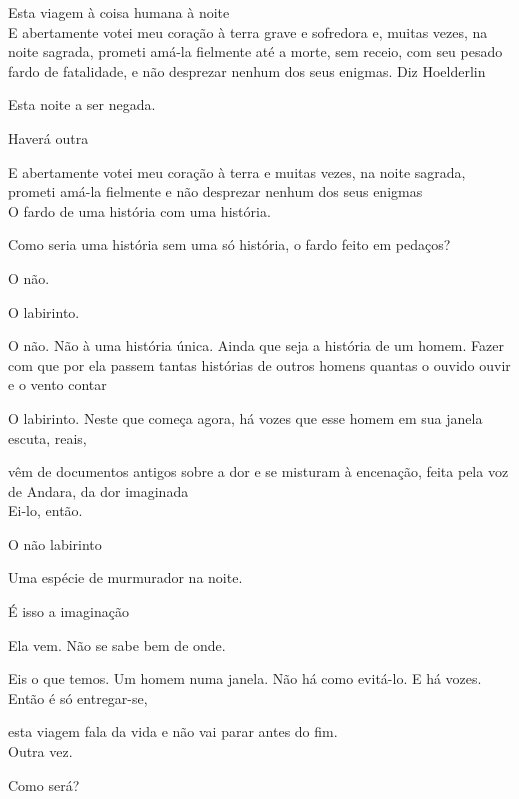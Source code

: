 \movetooddpage

\vspace*{4cm}

Esta viagem à coisa humana à noite\\

E abertamente votei meu coração à terra grave e sofredora e, muitas
vezes, na noite sagrada, prometi amá-la fielmente até a morte, sem
receio, com seu pesado fardo de fatalidade, e não desprezar nenhum dos
seus enigmas. Diz Hoelderlin

Esta noite a ser negada.

Haverá outra

E abertamente votei meu coração à terra e muitas vezes, na noite
sagrada, prometi amá-la fielmente e não desprezar nenhum dos seus
enigmas\\

O fardo de uma história com uma história.

Como seria uma história sem uma só história, o fardo feito em pedaços?

O não.

O labirinto.

O não. Não à uma história única. Ainda que seja a história de um homem.
Fazer com que por ela passem tantas histórias de outros homens quantas o
ouvido ouvir e o vento contar

O labirinto. Neste que começa agora, há vozes que esse homem em sua
janela escuta, reais,

vêm de documentos antigos sobre a dor e se misturam à encenação, feita
pela voz de Andara, da dor imaginada\\

Ei-lo, então.

O não labirinto

\breakk

\vspace*{4cm}

Uma espécie de murmurador na noite.

É isso a imaginação

Ela vem. Não se sabe bem de onde.

Eis o que temos. Um homem numa janela. Não há como evitá-lo. E há vozes.
Então é só entregar-se,

esta viagem fala da vida e não vai parar antes do fim.\\

Outra vez.

Como será?

\breakk

